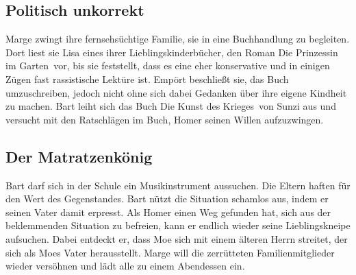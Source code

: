 
\subsection{Politisch unkorrekt}
Marge zwingt ihre fernsehsüchtige Familie, sie in eine Buchhandlung zu begleiten. Dort liest sie Lisa eines ihrer Lieblingskinderbücher, den Roman \glqq Die Prinzessin im Garten\grqq\ vor, bis sie feststellt, dass es eine eher konservative und in einigen Zügen fast rassistische Lektüre ist. Empört beschließt sie, das Buch umzuschreiben, jedoch nicht ohne sich dabei Gedanken über ihre eigene Kindheit zu machen. Bart leiht sich das Buch \glqq Die Kunst des Krieges\grqq\ von Sunzi aus und versucht mit den Ratschlägen im Buch, Homer seinen Willen aufzuzwingen.


\subsection{Der Matratzenkönig}\label{XABF10}
Bart darf sich in der Schule ein Musikinstrument aussuchen. Die Eltern haften für den Wert des Gegenstandes. Bart nützt die Situation schamlos aus, indem er seinen Vater damit erpresst. Als Homer einen Weg gefunden hat, sich aus der beklemmenden Situation zu befreien, kann er endlich wieder seine Lieblingskneipe aufsuchen. Dabei entdeckt er, dass Moe sich mit einem älteren Herrn streitet, der sich als Moes Vater herausstellt. Marge will die zerrütteten Familienmitglieder wieder versöhnen und lädt alle zu einem Abendessen ein.

